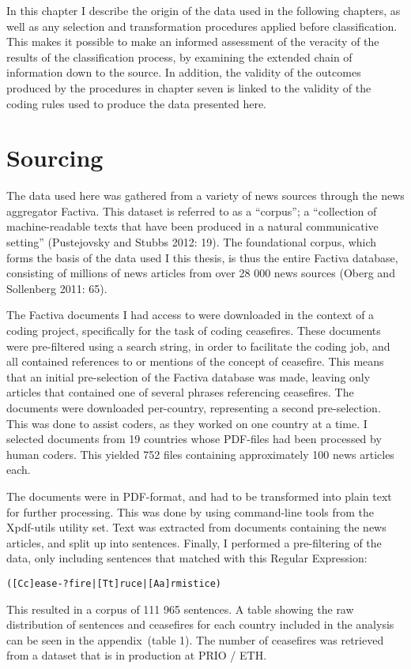 \documentclass[12pt,twoside]{reedthesis}
\begin{document}
In this chapter I describe the origin of the data used in the following
chapters, as well as any selection and transformation procedures applied
before classification. This makes it possible to make an informed
assessment of the veracity of the results of the classification process,
by examining the extended chain of information down to the source. In
addition, the validity of the outcomes produced by the procedures in
chapter seven is linked to the validity of the coding rules used to
produce the data presented here.

\section{Sourcing}\label{sourcing-1}

The data used here was gathered from a variety of news sources through
the news aggregator Factiva. This dataset is referred to as a
``corpus''; a ``collection of machine-readable texts that have been
produced in a natural communicative setting'' (Pustejovsky and Stubbs
2012: 19). The foundational corpus, which forms the basis of the data
used I this thesis, is thus the entire Factiva database, consisting of
millions of news articles from over 28 000 news sources (Oberg and
Sollenberg 2011: 65).

The Factiva documents I had access to were downloaded in the context of
a coding project, specifically for the task of coding ceasefires. These
documents were pre-filtered using a search string, in order to
facilitate the coding job, and all contained references to or mentions
of the concept of ceasefire. This means that an initial pre-selection of
the Factiva database was made, leaving only articles that contained one
of several phrases referencing ceasefires. The documents were downloaded
per-country, representing a second pre-selection. This was done to
assist coders, as they worked on one country at a time. I selected
documents from 19 countries whose PDF-files had been processed by human
coders. This yielded 752 files containing approximately 100 news
articles each.

The documents were in PDF-format, and had to be transformed into plain
text for further processing. This was done by using command-line tools
from the Xpdf-utils utility set. Text was extracted from documents
containing the news articles, and split up into sentences. Finally, I
performed a pre-filtering of the data, only including sentences that
matched with this Regular Expression:
\begin{verbatim}
([Cc]ease-?fire|[Tt]ruce|[Aa]rmistice)
\end{verbatim}
This resulted in a corpus of 111 965 sentences. A table showing the raw
distribution of sentences and ceasefires for each country included in
the analysis can be seen in the appendix~(table 1). The number of
ceasefires was retrieved from a dataset that is in production at PRIO /
ETH.
\end{document}
